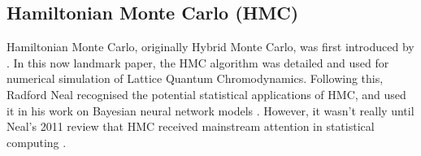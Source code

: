 %
%
%
%

\subsection{Hamiltonian Monte Carlo (HMC)}

Hamiltonian Monte Carlo, originally Hybrid Monte Carlo, was first introduced by
\textcite{duane87}. In this now landmark paper, the HMC algorithm was detailed and used
for numerical simulation of Lattice Quantum Chromodynamics. Following this, Radford Neal
recognised the potential statistical applications of HMC, and used it in his work on
Bayesian neural network models \parencite{neal95}. However, it wasn't really until Neal's
2011 review \parencite{neal11} that HMC received mainstream attention in statistical
computing \parencite{betancourt18}.

